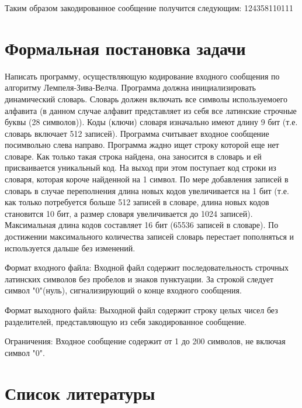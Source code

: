 \documentclass{article}
\begin{document}
Таким образом закодированное сообщение получится следующим:
124358110111

\section{Формальная постановка задачи}

Написать программу, осуществляющую кодирование входного сообщения по алгоритму Лемпеля-Зива-Велча. Программа должна инициализировать динамический словарь. Словарь должен включать все символы используемоего алфавита (в данном случае алфавит представляет из себя все латинские строчные буквы (28 символов)). Коды (ключи) словаря изначально имеют длину 9 бит (т.е. словарь включает 512 записей). Программа считывает входное сообщение посимвольно слева направо. Программа жадно ищет строку которой еще нет словаре. Как только такая строка найдена, она заносится в словарь и ей присваивается уникальный код. На выход при этом поступает код строки из словаря, которая короче найденной на 1 символ. По мере добавления записей в словарь в случае переполнения длина новых кодов увеличивается на 1 бит (т.е. как только потребуется больше 512 записей в словаре, длина новых кодов становится 10 бит, а размер словаря увеличивается до 1024 записей). Максимальная длина кодов составляет 16 бит (65536 записей в словаре). По достижении максимального количества записей словарь перестает пополняться и используется дальше без изменений.

Формат входного файла:
Входной файл содержит последовательность строчных латинских символов без пробелов и знаков пунктуации. За строкой следует символ "0"(нуль), сигнализирующий о конце входного сообщения.

Формат выходного файла:
Выходной файл содержит строку целых чисел без разделителей, представляющую из себя закодированное сообщение.

Ограничения:
Входное сообщение содержит от 1 до 200 символов, не включая символ "0".

\section{Список литературы}
\end{document}
